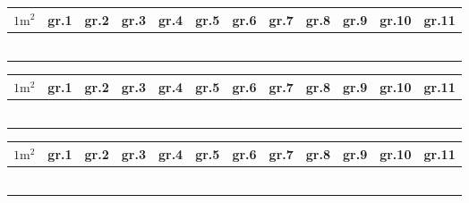 \begin{center}
	\begin{tabular}{|p{0.7cm}|p{0.7cm}|p{0.7cm}|p{0.7cm}|p{0.7cm}|p{0.7cm}|p{0.7cm}|p{0.7cm}|p{0.7cm}|p{0.7cm}|p{0.7cm}|p{0.7cm}|}
		\hline
		$ 1\textrm{m}^2 $ & gr.1& gr.2 & gr.3 & gr.4 & gr.5 & gr.6 & gr.7 & gr.8 & gr.9 & gr.10 & gr.11  \\ \hline
		&&&&&&&&&&& \\
		&&&&&&&&&&& \\
		&&&&&&&&&&& \\
		&&&&&&&&&&& \\\hline
		&&&&&&&&&&& \\
		&&&&&&&&&&& \\\hline
	\end{tabular}
\end{center}
\vspace{10pt}

\begin{center}
	\begin{tabular}{|p{0.7cm}|p{0.7cm}|p{0.7cm}|p{0.7cm}|p{0.7cm}|p{0.7cm}|p{0.7cm}|p{0.7cm}|p{0.7cm}|p{0.7cm}|p{0.7cm}|p{0.7cm}|}
		\hline
		$ 1\textrm{m}^2 $ & gr.1& gr.2 & gr.3 & gr.4 & gr.5 & gr.6 & gr.7 & gr.8 & gr.9 & gr.10 & gr.11  \\ \hline
		&&&&&&&&&&& \\
		&&&&&&&&&&& \\
		&&&&&&&&&&& \\
		&&&&&&&&&&& \\\hline
		&&&&&&&&&&& \\
		&&&&&&&&&&& \\\hline
	\end{tabular}
\end{center}
\vspace{10pt}

\begin{center}
	\begin{tabular}{|p{0.7cm}|p{0.7cm}|p{0.7cm}|p{0.7cm}|p{0.7cm}|p{0.7cm}|p{0.7cm}|p{0.7cm}|p{0.7cm}|p{0.7cm}|p{0.7cm}|p{0.7cm}|}
		\hline
		$ 1\textrm{m}^2 $ & gr.1& gr.2 & gr.3 & gr.4 & gr.5 & gr.6 & gr.7 & gr.8 & gr.9 & gr.10 & gr.11  \\ \hline
		&&&&&&&&&&& \\
		&&&&&&&&&&& \\
		&&&&&&&&&&& \\
		&&&&&&&&&&& \\\hline
		&&&&&&&&&&& \\
		&&&&&&&&&&& \\\hline
	\end{tabular}
\end{center}
\vspace{10pt}




